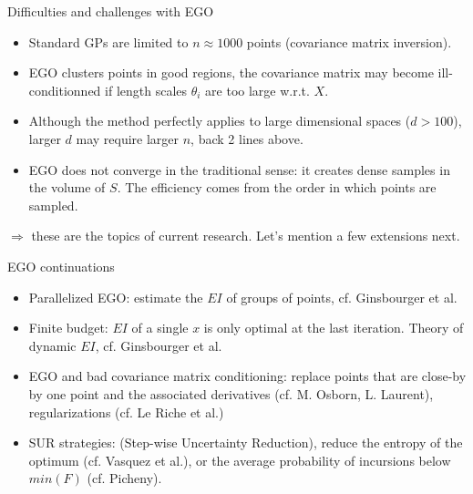 \begin{frame}{}
\begin{exampleblock}{Difficulties and challenges with EGO}
\begin{itemize}
\item Standard GPs are limited to $n \approx 1000$ points (covariance matrix inversion).
\item EGO clusters points in good regions, the covariance matrix may become ill-conditionned 
if length scales $\theta_i$ are too large w.r.t. $X$.
\item Although the method perfectly applies to large dimensional spaces ($d>100$), larger $d$ 
may require larger $n$, back 2 lines above.
\item EGO does not converge in the traditional sense: it creates dense samples in the volume of $S$. 
The efficiency comes from the order in which points are sampled.
\end{itemize}
$\Rightarrow$ these are the topics of current research. Let's mention a few extensions next.
\end{exampleblock}
\end{frame}

\begin{frame}{}
\begin{exampleblock}{EGO continuations}
\begin{itemize}
\item Parallelized EGO: estimate the $EI$ of groups of points, cf. Ginsbourger et al. 
\item Finite budget: $EI$ of a single $x$ is only optimal at the last iteration. Theory of dynamic $EI$, cf. Ginsbourger et al.
\item EGO and bad covariance matrix conditioning: replace points that are close-by by one point and the associated derivatives (cf. M. Osborn, L. Laurent), regularizations (cf. Le Riche et al.)
\item SUR strategies: (Step-wise Uncertainty Reduction), reduce the entropy of the optimum (cf. Vasquez et al.), or the average probability of incursions below $min(F)$ (cf. Picheny).
\end{itemize}
\end{exampleblock}
\end{frame}

